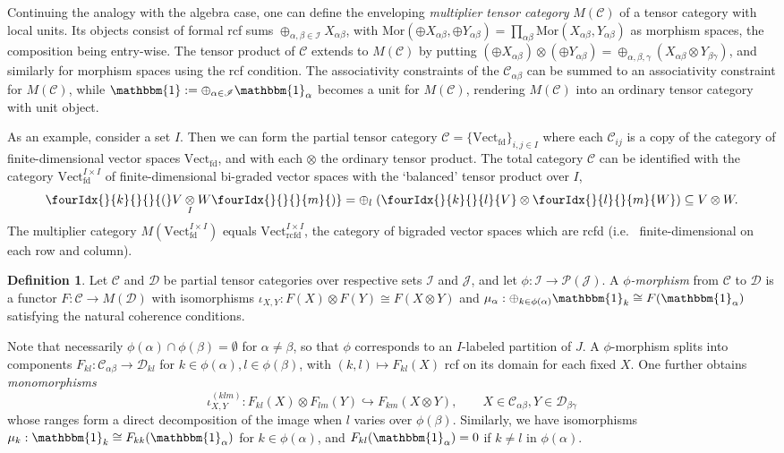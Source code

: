 \documentclass[10pt]{article}
\DeclareMathOperator{\fin}{\mathrm{fd}}
\DeclareMathOperator{\rcf}{\mathrm{rcfd}}
\newcommand{\CatC}{\mathcal{C}}
\newcommand{\CatD}{\mathcal{D}}
\newcommand{\CatCC}{\mathscr{C}}
\newcommand{\CatDD}{\mathscr{D}}
\newcommand{\Vectif}{\mathrm{Vect}^{I\times I}_{\fin}}
\newcommand{\Vectrcf}{\mathrm{Vect}^{I\times I}_{\rcf}}
\newcommand{\Mor}{\mathrm{Mor}}
\newcommand{\itimes}{\underset{I}{\otimes}}
\newcommand{\Vect}{\mathrm{Vect}}
\newcommand{\Unitb}{\mathbbm{1}}
\newcommand{\Gr}[5]{\fourIdx{#2}{#4}{#3}{#5}{#1}}%
\newcommand{\Gru}[3]{\Gr{#1}{}{}{#2}{#3}}
\theoremstyle{definition}
\newtheorem{Def}[Theorem]{Definition}
\numberwithin{equation}{section}
\begin{document}
Continuing the analogy with the algebra case, one can define the enveloping \emph{multiplier tensor category} $M(\CatC)$ of a tensor category with local units. Its objects consist of formal rcf sums $\oplus_{\alpha,\beta\in \mathscr{I}} X_{\alpha\beta}$, with $\Mor(\oplus X_{\alpha\beta},\oplus Y_{\alpha\beta}) =\prod_{\alpha\beta} \Mor(X_{\alpha\beta},Y_{\alpha\beta})$ as morphism spaces, the composition being entry-wise. The tensor product of $\CatC$ extends to $M(\CatC)$ by putting $\left(\oplus X_{\alpha\beta}\right)\otimes \left(\oplus Y_{\alpha\beta}\right) = \oplus_{\alpha,\beta,\gamma} \left(X_{\alpha\beta}\otimes Y_{\beta\gamma}\right)$, and similarly for morphism spaces using the rcf condition. The associativity constraints of the $\CatC_{\alpha\beta}$ can be summed to an associativity constraint for $M(\CatC)$, while $\Unitb := \oplus_{\alpha\in \mathscr{I}} \Unitb_\alpha$ becomes a unit for $M(\CatC)$, rendering $M(\CatC)$ into an ordinary tensor category with unit object.



As an example, consider a set $I$. Then we can form the partial tensor category $\CatCC = \{\Vect_{\fin}\}_{i,j\in I}$ where each $\CatC_{ij}$ is a copy of the category of finite-dimensional vector spaces $\Vect_{\fin}$, and with each $\otimes$ the ordinary tensor product. The total category $\CatC$ can be identified with the category $\Vectif$ of finite-dimensional bi-graded vector spaces with the `balanced' tensor product over $I$,  \[\Gru{(}{k}{}V\itimes W\Gru{)}{}{m} = \oplus_l \;(\Gru{V}{k}{l}\otimes \Gru{W}{l}{m})\subseteq V\otimes W.\] The multiplier category $M(\Vectif)$ equals $\Vectrcf$, the category of bigraded vector spaces which are rcfd (i.e.~ finite-dimensional on each row and column).

\begin{Def} Let $\CatCC$ and $\CatDD$ be partial tensor categories over respective sets $\mathscr{I}$ and $\mathscr{J}$, and let $\phi: \mathscr{I}\rightarrow \mathscr{P}(\mathscr{J})$. A \emph{$\phi$-morphism} from $\mathscr{C}$ to $\mathscr{D}$ is a functor $F:\CatC \rightarrow M(\CatD)$ with isomorphisms $\iota_{X,Y}:F(X)\otimes F(Y)\cong F(X\otimes Y)$ and $\mu_\alpha:\oplus_{k\in \phi(\alpha)} \Unitb_k \cong F(\Unitb_\alpha)$ satisfying the natural coherence conditions. 
\end{Def}

Note that necessarily $\phi(\alpha)\cap \phi(\beta)=\emptyset$ for
$\alpha\neq \beta$, so that $\phi$ corresponds to an $I$-labeled
partition of $J$.  A $\phi$-morphism splits into components $F_{kl}:
\CatC_{\alpha\beta} \rightarrow \CatD_{kl}$ for $k\in\phi(\alpha),l\in
\phi(\beta)$, with $(k,l)\mapsto F_{kl}(X)$ rcf on its domain for each
fixed $X$. One further obtains
\emph{monomorphisms} \[\iota^{(klm)}_{X,Y}:F_{kl}(X) \otimes F_{lm}(Y)
\hookrightarrow F_{km}(X\otimes Y), \qquad X\in
\CatC_{\alpha\beta},Y\in \CatD_{\beta\gamma}\] whose ranges form a
direct decomposition of the image when $l$ varies over
$\phi(\beta)$. Similarly, we have isomorphisms $\mu_{k}: \Unitb_k
\cong F_ {kk}(\Unitb_{\alpha})$ for $k\in \phi(\alpha)$, and
$F_{kl}(\Unitb_{\alpha})= 0$ if $k\neq l$ in $\phi(\alpha)$.
\end{document}
